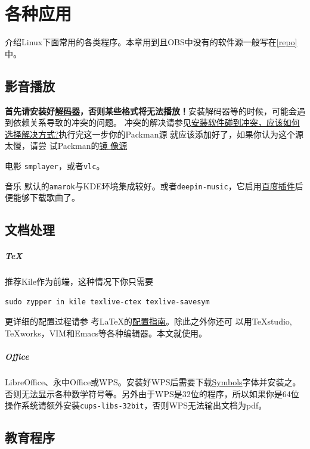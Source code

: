 \documentclass[11pt,openany]{book}
\newcommand{\soft}[1]{\texttt{\textcolor{dgreen}{#1}}}
\newcommand{\emp}[1]{\textbf{#1}}
\begin{document}
\chapter{各种应用}
介绍Linux下面常用的各类程序。本章用到且OBS中没有的软件源一般写在\ref{repo}中。
\section{影音播放}
\emp{首先请安装好\href{https://lug.ustc.edu.cn/sites/opensuse-guide/codecs.php}{解码器}，否则某些格式将无法播放！}安装解码器等的时候，可能会遇到依赖关系导致的冲突的问题。
冲突的解决请参见\href{https://forum.suse.org.cn/viewtopic.php?t=2867&p=22491#p22491}{安装软件碰到冲突，应该如何选择解决方式?}执行完这一步你的Packman源
就应该添加好了，如果你认为这个源太慢，请尝
试Packman的\href{http://packman.links2linux.org/mirrors}{镜%
像源}
\begin{compactdesc}
 \item[电影] \soft{smplayer}，或者\soft{vlc}。
 \item[音乐] 默认的\soft{amarok}与KDE环境集成较好。或者\soft{deepin-music}，它启用\href{https://forum.suse.org.cn/viewtopic.php?f=7&t=2530}{百度插件}后便能够下载歌曲了。
\end{compactdesc}

\section{文档处理}
\paragraph{\TeX}推荐Kile作为前端，这种情况下你只需要
\begin{Verbatim}[formatcom=\color{codec}]
    sudo zypper in kile texlive-ctex texlive-savesym
\end{Verbatim}
更详细的配置过程请参
考\LaTeX 的\href{https://forum.suse.org.cn/viewtopic.php?f=6&t=2392&p=18750}{配置指南}。除此之外你还可
以用\TeX studio, \TeX works，VIM和Emacs等各种编辑器。本文就使用。

\paragraph{Office}LibreOffice、永中Office或WPS。安装好WPS后需要下载\href{http://pan.baidu.com/s/1ntMEU2P}{Symbols}字体并安装之。否则无法显示各种数学符号等。另外由于WPS是32位的程序，所以如果你是64位操作系统请额外安装\soft{cups-libs-32bit}，否则WPS无法输出文档为pdf。
\section{教育程序}
\end{document}
